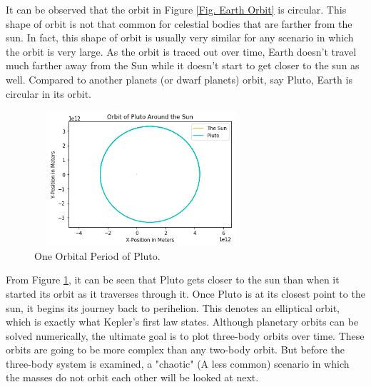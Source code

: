 \documentclass[twocolumn]{article}
\begin{document}
\par \noindent
It can be observed that the orbit in Figure \ref{Fig. Earth Orbit} is circular. This shape of orbit is not that common for celestial bodies that are farther from the sun. In fact, this shape of orbit is usually very similar for any scenario in which the orbit is very large. As the orbit is traced out over time, Earth doesn't travel much farther away from the Sun while it doesn't start to get closer to the sun as well. Compared to another planets (or dwarf planets) orbit, say Pluto, Earth is circular in its orbit.
\begin{figure}[h]
    \centering
    \includegraphics[width=8cm, height=5cm]{Figures/FP Pluto Orbit.png}
    \caption{\small{One Orbital Period of Pluto.}}
    \label{Fig. Pluto Orbit}
\end{figure}
\par \noindent
From Figure \ref{Fig. Pluto Orbit}, it can be seen that Pluto gets closer to the sun than when it started its orbit as it traverses through it. Once Pluto is at its closest point to the sun, it begins its journey back to perihelion. This denotes an elliptical orbit, which is exactly what Kepler's first law states. Although planetary orbits can be solved numerically, the ultimate goal is to plot three-body orbits over time. These orbits are going to be more complex than any two-body orbit. But before the three-body system is examined, a "chaotic" (A less common) scenario in which the masses do not orbit each other will be looked at next.
\end{document}
